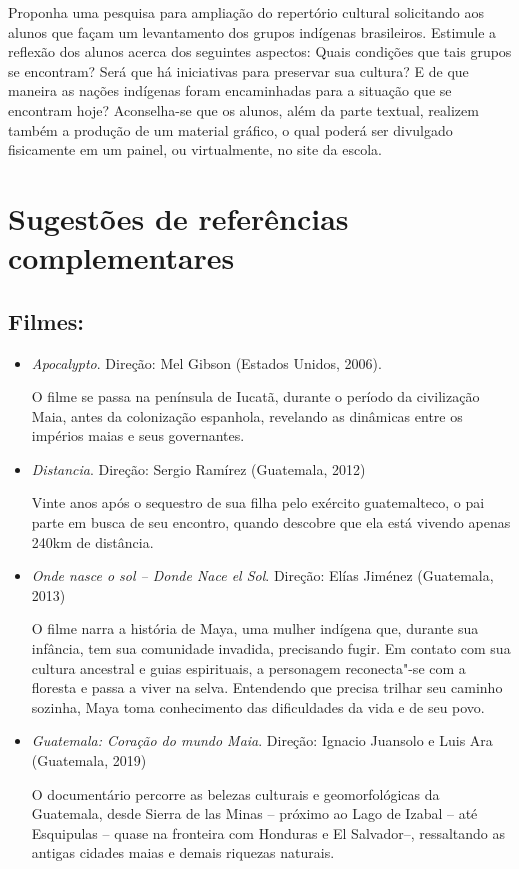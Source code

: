 \documentclass[11pt]{extarticle}
\begin{document}
  Proponha uma pesquisa para ampliação do repertório cultural
  solicitando aos alunos que façam um levantamento dos grupos indígenas
  brasileiros. Estimule a reflexão dos alunos acerca dos seguintes
  aspectos: Quais condições que tais grupos se encontram? Será que há
  iniciativas para preservar sua cultura? E de que maneira as nações
  indígenas foram encaminhadas para a situação que se encontram hoje?
  Aconselha-se que os alunos, além da parte textual, realizem também a
  produção de um material gráfico, o qual poderá ser divulgado
  fisicamente em um painel, ou virtualmente, no site da escola.

\section{Sugestões de referências complementares}\label{sugestoes}

\subsection{Filmes:}

\begin{itemize}
\item\textit{Apocalypto}. Direção: Mel Gibson (Estados Unidos, 2006).

O filme se passa na península de Iucatã, durante o período da civilização Maia, antes da colonização 
espanhola, revelando as dinâmicas entre os impérios maias e seus governantes.

\item\textit{Distancia}. Direção: Sergio Ramírez (Guatemala, 2012)

Vinte anos após o sequestro de sua filha pelo exército guatemalteco, o pai parte em busca de seu 
encontro, quando descobre que ela está vivendo apenas 240km de distância.

\item\textit{Onde nasce o sol -- Donde Nace el Sol}. Direção: Elías Jiménez (Guatemala, 2013)

O filme narra a história de Maya, uma mulher indígena que, durante sua infância, tem sua comunidade 
invadida, precisando fugir. Em contato com sua cultura ancestral e guias espirituais, a personagem 
reconecta"-se com a floresta e passa a viver na selva. Entendendo que precisa trilhar seu caminho 
sozinha, Maya toma conhecimento das dificuldades da vida e de seu povo.

\item\textit{Guatemala: Coração do mundo Maia}. Direção: Ignacio Juansolo e Luis Ara (Guatemala, 2019)

O documentário percorre as belezas culturais e geomorfológicas da Guatemala, desde Sierra de las Minas --
próximo ao Lago de Izabal -- até Esquipulas -- quase na fronteira com Honduras e El Salvador--, ressaltando 
as antigas cidades maias e demais riquezas naturais.
\end{itemize}
\end{document}
